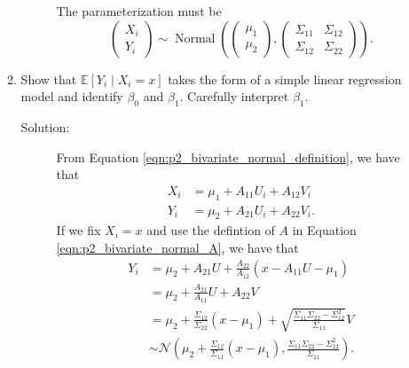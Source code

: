 \documentclass[letterpaper,11pt]{article}
\begin{document}
\begin{enumerate}
\begin{enumerate}
\begin{description}
      The parameterization must be
      \begin{equation}
        \begin{pmatrix}
          X_i \\
          Y_i
        \end{pmatrix} \sim
        \operatorname{Normal}\left(
          \begin{pmatrix}
            \mu_1 \\ \mu_2
          \end{pmatrix},
          \begin{pmatrix}
            \Sigma_{11} & \Sigma_{12} \\
            \Sigma_{12} & \Sigma_{22}
          \end{pmatrix}
        \right).
        \label{eqn:p2_xy_dist}
      \end{equation}
    \end{description}
  \item Show that $\mathbb{E}\left[Y_i \mid X_i = x\right]$ takes the form of a
    simple linear regression model and identify $\beta_0$ and
    $\beta_1$. Carefully interpret $\beta_1$.

    \begin{description}
    \item[Solution:] From Equation \ref{eqn:p2_bivariate_normal_definition}, we
      have that
      \begin{align*}
        X_i &= \mu_{1} + A_{11}U_i + A_{12}V_i \\
        Y_i &= \mu_{2} + A_{21}U_i + A_{22}V_i.
      \end{align*}
      If we fix $X_i = x$ and use the defintion of $A$ in Equation
      \ref{eqn:p2_bivariate_normal_A}, we have that
      \begin{align}
        Y_i
        &= \mu_2 + A_{21}U + \frac{A_{22}}{A_{12}}\left(
          x - A_{11}U - \mu_1
          \right) \nonumber\\
        &= \mu_2 + \frac{A_{21}}{A_{11}}U + A_{22}V \nonumber\\
        &= \mu_2 + \frac{\Sigma_{12}}{\Sigma_{22}}\left(x - \mu_1\right)
          + \sqrt{\frac{\Sigma_{11}\Sigma_{22} - \Sigma_{12}^2}{\Sigma_{11}}}V \nonumber\\
        &\sim \mathcal{N}\left(
          \mu_2 + \frac{\Sigma_{12}}{\Sigma_{11}}\left(x - \mu_1\right)
          ,
          \frac{\Sigma_{11}\Sigma_{22} - \Sigma_{12}^2}{\Sigma_{11}}
          \right). \label{eqn:p2_conditional_y_dist}
      \end{align}


\end{description}
\end{enumerate}
\end{enumerate}
\end{document}
